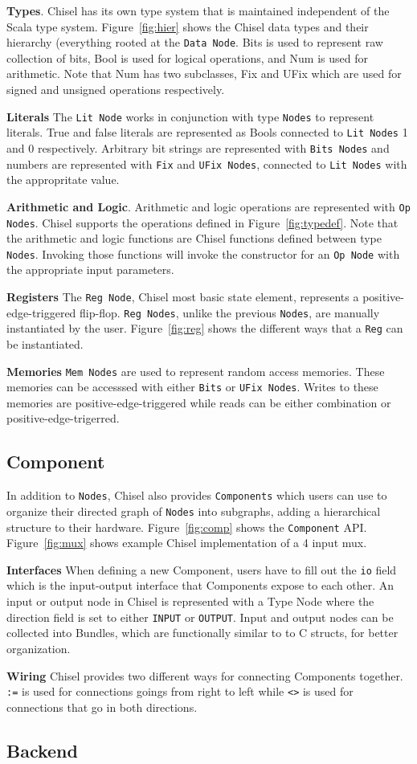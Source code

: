{\bf Types}. Chisel has its own type system that is maintained
independent of the Scala type system. Figure~\ref{fig:hier} shows the
Chisel data types and their hierarchy (everything rooted at the 
{\tt Data Node}. Bits is used to represent raw collection of bits, Bool is used
for logical operations, and Num is used for arithmetic. Note that Num
has two subclasses, Fix and UFix which are used for signed and
unsigned operations respectively.

{\bf Literals} The {\tt Lit Node} works in conjunction with type {\tt Nodes} to
represent literals. True and false literals are represented as Bools
connected to {\tt Lit Nodes} 1 and 0 respectively. Arbitrary bit strings are
represented with {\tt Bits Nodes} and numbers are represented with
{\tt Fix} and {\tt UFix Nodes}, connected to {\tt Lit Nodes} with the
appropritate value.

{\bf Arithmetic and Logic}. Arithmetic and logic operations
are represented with {\tt Op Nodes}. Chisel supports the operations defined
in Figure~\ref{fig:typedef}. Note that the arithmetic and logic
functions are Chisel functions defined between type {\tt Nodes}. Invoking
those functions will invoke the constructor for an {\tt Op Node} with the
appropriate input parameters.

{\bf Registers} The {\tt Reg Node}, Chisel most basic state element,
represents a positive-edge-triggered flip-flop. {\tt Reg Nodes}, unlike the
previous {\tt Nodes}, are manually instantiated by the
user. Figure~\ref{fig:reg} shows the different ways that a {\tt Reg} can be
instantiated.

{\bf Memories} {\tt Mem Nodes} are used to represent random access
memories. These memories can be accesssed with either {\tt Bits} or
{\tt UFix Nodes}. Writes to these memories are positive-edge-triggered while
reads can be either combination or positive-edge-trigerred.

\subsection{Component}
In addition to {\tt Nodes}, Chisel also provides {\tt Components} which users can
use to organize their directed graph of {\tt Nodes} into subgraphs, adding a
hierarchical structure to their hardware. Figure~\ref{fig:comp} shows
the {\tt Component} API. Figure~\ref{fig:mux} shows example Chisel
implementation of a 4 input mux.

{\bf Interfaces} When defining a new Component, users have to fill out
the {\tt io} field which is the input-output interface that
Components expose to each other. An input or output node in Chisel is
represented with a Type Node where the direction field is set to
either {\tt INPUT} or {\tt OUTPUT}. Input and output nodes can be
collected into Bundles, which are functionally similar to to C
structs, for better organization. 

{\bf Wiring} Chisel provides two different ways for connecting
Components together. {\tt :=} is used for connections goings from
right to left while {\tt <>} is used for connections that go in both directions.

\subsection{Backend}
\cite{Bachrach:2012}
